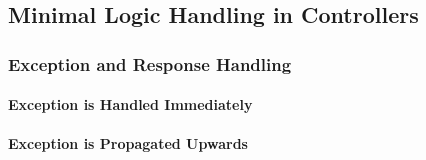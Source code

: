 \subsection{Minimal Logic Handling in Controllers}

\subsubsection{Exception and Response Handling}

\paragraph{Exception is Handled Immediately}

\paragraph{Exception is Propagated Upwards}